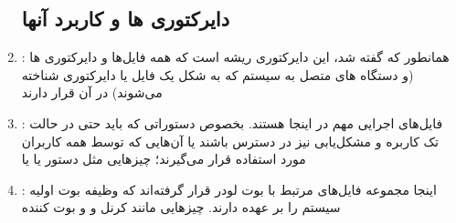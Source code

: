\begin{enumerate}
\subsection*{دایرکتوری ها و کاربرد آنها}
\item {\large\lr{\textbf{\bidihl{/}}}}:
همانطور که گفته شد، این دایرکتوری ریشه است که همه فایل‌ها و دایرکتوری ها (و دستگاه های متصل به سیستم که به شکل یک فایل یا دایرکتوری شناخته می‌شوند) در آن قرار دارند
\item {\large{}}:
فایل‌های اجرایی مهم در اینجا هستند. بخصوص دستوراتی که باید حتی در حالت تک کاربره و مشکل‌یابی نیز در دسترس باشند یا آن‌هایی که توسط همه کاربران مورد استفاده قرار می‌گیرند؛ چیزهایی مثل دستور 
 یا
 یا

\item {\large{}}:
اینجا مجموعه فایل‌های مرتبط با بوت لودر قرار گرفته‌اند که وظیفه بوت اولیه سیستم را بر عهده دارند. چیزهایی مانند کرنل و 
 و بوت کننده 


\end{enumerate}
